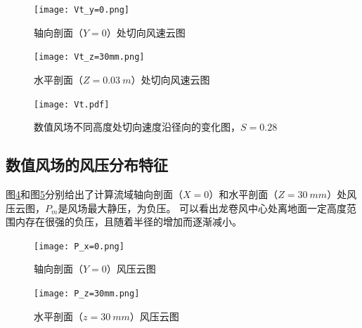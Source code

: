 
\begin{figure}[!htbp]
  \centering
  \texttt{[image: Vt\_y=0.png]}
  \caption{轴向剖面（$Y=0$）处切向风速云图}
  \label{fig:Vt-x=0}
\end{figure}

\begin{figure}[!htbp]
  \centering
  \texttt{[image: Vt\_z=30mm.png]}
  \caption{水平剖面（$Z=\SI{0.03}{m}$）处切向风速云图}
  \label{fig:Vt-z=30mm}
\end{figure}

\begin{figure}
	\centering
	\texttt{[image: Vt.pdf]}
	\caption{数值风场不同高度处切向速度沿径向的变化图，$S=0.28$}
	\label{fig:Vt}
\end{figure}

\subsection{数值风场的风压分布特征}
图\ref{fig:P-x=0}和图\ref{fig:P-z=30mm}分别给出了计算流域轴向剖面（$X=0$）和水平剖面（$Z=\SI{30}{mm}$）处风压云图，$P_m$是风场最大静压，为负压。
可以看出龙卷风中心处离地面一定高度范围内存在很强的负压，且随着半径的增加而逐渐减小。

\begin{figure}[!htbp]
  \centering
  \texttt{[image: P\_x=0.png]}
  \caption{轴向剖面（$Y=0$）风压云图}
  \label{fig:P-x=0}
\end{figure}

\begin{figure}[!htbp]
  \centering
  \texttt{[image: P\_z=30mm.png]}
  \caption{水平剖面（$z=\SI{30}{mm}$）风压云图}
  \label{fig:P-z=30mm}
\end{figure}


